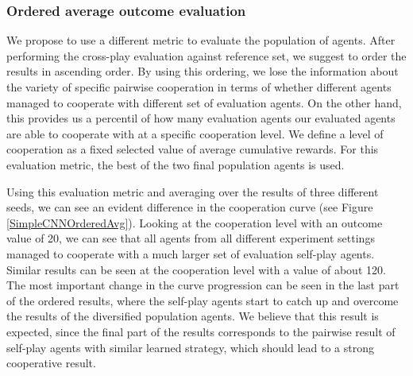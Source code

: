 \subsubsection{Ordered average outcome evaluation}\label{OrderedEvaluation}
We propose to use a different metric to evaluate the population of agents.
After performing the cross-play evaluation against reference set, we suggest to order the results in ascending order.
By using this ordering, we lose the information about the variety of specific pairwise cooperation in terms of whether different agents managed to cooperate with different set of evaluation agents.
On the other hand, this provides us a percentil of how many evaluation agents our evaluated agents are able to cooperate with at a specific cooperation level.
We define a level of cooperation as a fixed selected value of average cumulative rewards.
For this evaluation metric, the best of the two final population agents is used.

Using this evaluation metric and averaging over the results of three different seeds, we can see an evident difference in the cooperation curve (see Figure \ref{SimpleCNNOrderedAvg}).
Looking at the cooperation level with an outcome value of 20, we can see that all agents from all different experiment settings managed to cooperate with a much larger set of evaluation self-play agents.
Similar results can be seen at the cooperation level with a value of about 120.
The most important change in the curve progression can be seen in the last part of the ordered results, where the self-play agents start to catch up and overcome the results of the diversified population agents.
We believe that this result is expected, since the final part of the results corresponds to the pairwise result of self-play agents with similar learned strategy, which should lead to a strong cooperative result.

